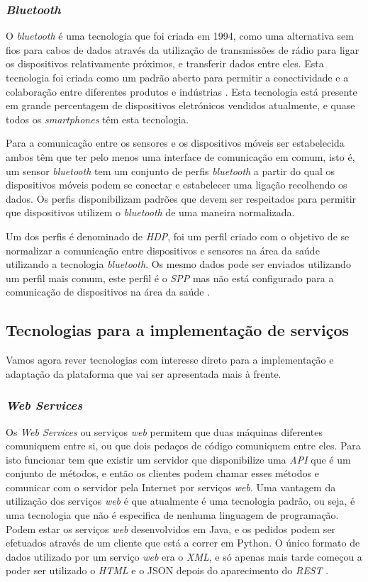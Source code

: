 \subsubsection{\textit{Bluetooth}}
O \textit{bluetooth} é uma tecnologia que foi criada em 1994, como uma alternativa sem fios para cabos de dados através da utilização de transmissões de rádio para ligar os dispositivos relativamente próximos, e transferir dados entre eles. Esta tecnologia foi criada como um padrão aberto para permitir a conectividade e a colaboração entre diferentes produtos e indústrias \cite{bluetooth}.
Esta tecnologia está presente em grande percentagem de dispositivos eletrónicos vendidos atualmente, e quase todos os \textit{smartphones} têm esta tecnologia.
\par 
Para a comunicação entre os sensores e os dispositivos móveis ser estabelecida ambos têm que ter pelo menos uma interface de comunicação em comum, isto é, um sensor \textit{bluetooth} tem um conjunto de perfis \textit{bluetooth} a partir do qual os dispositivos móveis podem se conectar e estabelecer uma ligação recolhendo os dados. 
Os perfis disponibilizam padrões que devem ser respeitados para permitir que dispositivos utilizem o \textit{bluetooth} de uma maneira normalizada. \cite{bluetooth-article}
\par
Um dos perfis é denominado de \textit{\gls{HDP}}, foi um perfil criado com o objetivo de se normalizar a comunicação entre dispositivos e sensores na área da saúde utilizando a tecnologia \textit{bluetooth}. Os mesmo dados pode ser enviados utilizando um perfil mais comum, este perfil é o \textit{\gls{SPP}} mas não está configurado para a comunicação de dispositivos na área da saúde \cite{bt-article}.

\subsection{Tecnologias para a implementação de serviços}
Vamos agora rever tecnologias com interesse direto para a implementação e adaptação da plataforma que vai ser apresentada mais à frente.
\subsubsection{\textit{Web Services}}
Os \textit{Web Services} ou serviços \textit{web} permitem que duas máquinas diferentes comuniquem entre si, ou que dois pedaços de código comuniquem entre eles. Para isto funcionar tem que existir um servidor que disponibilize uma \textit{\gls{API}} que é um conjunto de métodos, e então os clientes podem chamar esses métodos e comunicar com o servidor pela Internet por serviços \textit{web}. Uma vantagem da utilização dos serviços \textit{web} é que atualmente é uma tecnologia padrão, ou seja, é uma tecnologia que não é especifica de nenhuma linguagem de programação. Podem estar os serviços \textit{web} desenvolvidos em Java, e os pedidos podem ser efetuados através de um cliente que está a correr em Python. O único formato de dados utilizado por um serviço \textit{web} era o \textit{\gls{XML}}, e só apenas mais tarde começou a poder ser utilizado o \textit{\gls{HTML}} e o \gls{JSON} depois do aparecimento do \textit{\gls{REST}} \cite{wsjakob}.




